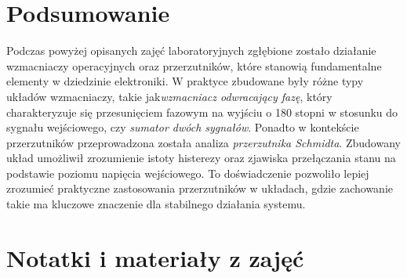 \documentclass{article}
\begin{document}
  \section{Podsumowanie}
    Podczas powyżej opisanych zajęć laboratoryjnych zgłębione zostało działanie wzmacniaczy operacyjnych oraz przerzutników, które stanowią fundamentalne elementy w dziedzinie elektroniki. W praktyce zbudowane były różne typy układów wzmacniaczy, takie jak\textit{wzmacniacz odwracający fazę}, który charakteryzuje się przesunięciem fazowym na wyjściu o 180 stopni w stosunku do sygnału wejściowego, czy \textit{sumator dwóch sygnałów}.
    Ponadto w kontekście przerzutników przeprowadzona została analiza \textit{przerzutnika Schmidta}. Zbudowany układ umożliwił zrozumienie istoty histerezy oraz zjawiska przełączania stanu na podstawie poziomu napięcia wejściowego. To doświadczenie pozwoliło lepiej zrozumieć praktyczne zastosowania przerzutników w układach, gdzie zachowanie takie ma kluczowe znaczenie dla stabilnego działania systemu.

  \section{Notatki i materiały z zajęć}
\end{document}
